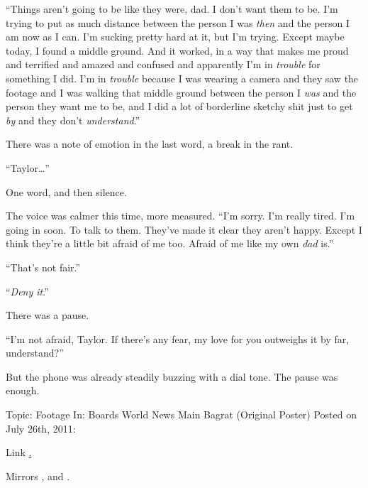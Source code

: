 ``Things aren't going to be like they were, dad.  I don't want them to be.  I'm trying to put as much distance between the person I was \emph{then} and the person I am now as I can.  I'm sucking pretty hard at it, but I'm trying.  Except maybe today, I found a middle ground.  And it worked, in a way that makes me proud and terrified and amazed and confused and apparently I'm in \emph{trouble} for something I did.  I'm in \emph{trouble} because I was wearing a camera and they saw the footage and I was walking that middle ground between the person I \emph{was} and the person they want me to be, and I did a lot of borderline sketchy shit just to get \emph{by} and they don't \emph{understand}.''



There was a note of emotion in the last word, a break in the rant.



``Taylor\ldots''



One word, and then silence.



The voice was calmer this time, more measured.  ``I'm sorry.  I'm really tired.  I'm going in soon.  To talk to them.  They've made it clear they aren't happy.  Except I think they're a little bit afraid of me too.  Afraid of me like my own \emph{dad} is.''



``That's not fair.''



``\emph{Deny it}.''



There was a pause.



``I'm not afraid, Taylor.  If there's any fear, my love for you outweighs it by far, understand?''



But the phone was already steadily buzzing with a dial tone.  The pause was enough.



\sectionbreak



\blacklozenge  Topic:  Footage
In:  Boards \blacktriangleright World News \blacktriangleright Main
Bagrat (Original Poster)
Posted on July 26th, 2011:



Link \underline{.}



Mirrors \underline{}, \underline{} and \underline{}.



